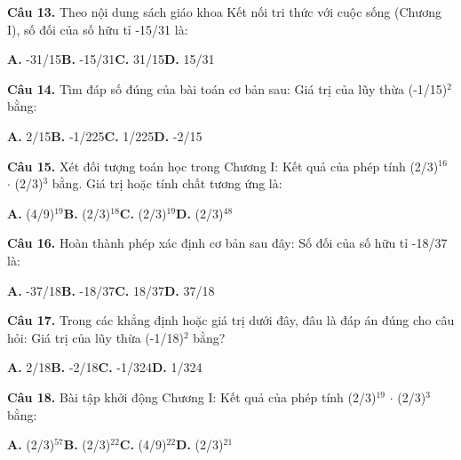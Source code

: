 \documentclass[11pt,a4paper]{article}
\begin{document}
\textbf{\color{primary} Câu 13.} Theo nội dung sách giáo khoa Kết nối tri thức với cuộc sống (Chương I), số đối của số hữu tỉ -15/31 là:\par
\hspace*{1.5em}\textbf{A.} -31/15\quad\quad \textbf{B.} -15/31\quad\quad \textbf{C.} 31/15\quad\quad \textbf{D.} 15/31\par\vspace{2pt}
\textbf{\color{primary} Câu 14.} Tìm đáp số đúng của bài toán cơ bản sau: Giá trị của lũy thừa (-1/15)$^2$ bằng:\par
\hspace*{1.5em}\textbf{A.} 2/15\quad\quad \textbf{B.} -1/225\quad\quad \textbf{C.} 1/225\quad\quad \textbf{D.} -2/15\par\vspace{2pt}
\textbf{\color{primary} Câu 15.} Xét đối tượng toán học trong Chương I: Kết quả của phép tính (2/3)$^{16}$ $\cdot$ (2/3)$^{3}$ bằng. Giá trị hoặc tính chất tương ứng là:\par
\hspace*{1.5em}\textbf{A.} (4/9)$^{19}$\quad\quad \textbf{B.} (2/3)$^{18}$\quad\quad \textbf{C.} (2/3)$^{19}$\quad\quad \textbf{D.} (2/3)$^{48}$\par\vspace{2pt}
\textbf{\color{primary} Câu 16.} Hoàn thành phép xác định cơ bản sau đây: Số đối của số hữu tỉ -18/37 là:\par
\hspace*{1.5em}\textbf{A.} -37/18\quad\quad \textbf{B.} -18/37\quad\quad \textbf{C.} 18/37\quad\quad \textbf{D.} 37/18\par\vspace{2pt}
\textbf{\color{primary} Câu 17.} Trong các khẳng định hoặc giá trị dưới đây, đâu là đáp án đúng cho câu hỏi: Giá trị của lũy thừa (-1/18)$^2$ bằng?\par
\hspace*{1.5em}\textbf{A.} 2/18\quad\quad \textbf{B.} -2/18\quad\quad \textbf{C.} -1/324\quad\quad \textbf{D.} 1/324\par\vspace{2pt}
\textbf{\color{primary} Câu 18.} Bài tập khởi động Chương I: Kết quả của phép tính (2/3)$^{19}$ $\cdot$ (2/3)$^{3}$ bằng:\par
\hspace*{1.5em}\textbf{A.} (2/3)$^{57}$\quad\quad \textbf{B.} (2/3)$^{22}$\quad\quad \textbf{C.} (4/9)$^{22}$\quad\quad \textbf{D.} (2/3)$^{21}$\par\vspace{2pt}
\end{document}
